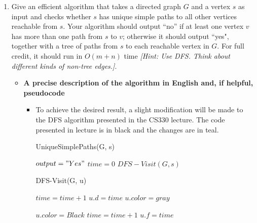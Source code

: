 \documentclass[letterpaper,11pt]{article}
\begin{document}
\begin{enumerate}
\begin{enumerate}
        \newpage
    \item Give an efficient algorithm that takes a directed graph $G$ and a vertex $s$ as input and checks whether $s$ has unique simple paths to all other vertices reachable from $s$. Your algorithm should output ``no'' if at least one vertex $v$ has more than one path from $s$ to $v$; otherwise it should output ``yes", together with  a tree of paths from $s$ to each reachable vertex in $G$.  For full credit, it should run in $O(m+n)$ time \emph{[Hint: Use DFS. Think about different kinds of non-tree edges.]}.
    \begin{itemize}
        \color{teal}
        \item \textbf{A precise description of the algorithm in English and, if helpful,
            pseudocode}

        \begin{itemize}
            \color{teal}
            \item To achieve the desired result, a slight modification will be 
                made to the DFS algorithm presented in the CS330 lecture. The 
                code presented in lecture is in black and the changes are in 
                teal.

        \color{black}

        \begin{algorithm}[H]
            \color{teal}
            \caption{UniqueSimplePaths(G, s)} 
            $output = "Yes"$\;
            $time = 0$ \;
            $DFS-Visit\left( G, s \right) $ \;
        \end{algorithm}

        \color{black}
        \begin{algorithm}[H]
            \caption{DFS-Visit(G, u)} 
            $time = time + 1$ \;
            $u.d = time$ \;
             $u.color = gray$ \;

            $u.color = Black$ \;
            $time = time + 1$ \;
            $u.f = time$ \;


\end{algorithm}
\end{itemize}
\end{itemize}
\end{enumerate}
\end{enumerate}
\end{document}
